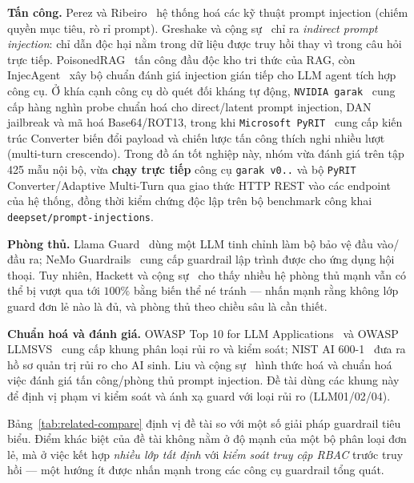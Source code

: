 \textbf{Tấn công.} Perez và Ribeiro~\cite{perez2022ignore} hệ thống hoá các kỹ
thuật prompt injection (chiếm quyền mục tiêu, rò rỉ prompt). Greshake và cộng
sự~\cite{greshake2023indirect} chỉ ra \emph{indirect prompt injection}: chỉ dẫn
độc hại nằm trong dữ liệu được truy hồi thay vì trong câu hỏi trực tiếp.
PoisonedRAG~\cite{zou2024poisonedrag} tấn công đầu độc kho tri thức của RAG, còn
InjecAgent~\cite{zhan2024injecagent} xây bộ chuẩn đánh giá injection gián tiếp cho
LLM agent tích hợp công cụ. Ở khía cạnh công cụ dò quét đối kháng tự động, \texttt{NVIDIA garak}~\cite{derczynski2024garak} cung cấp hàng nghìn probe chuẩn hoá cho direct/latent prompt injection, DAN jailbreak và mã hoá Base64/ROT13, trong khi \texttt{Microsoft PyRIT}~\cite{microsoft_pyrit} cung cấp kiến trúc Converter biến đổi payload và chiến lược tấn công thích nghi nhiều lượt (multi-turn crescendo). Trong đồ án tốt nghiệp này, nhóm vừa đánh giá trên tập 425 mẫu nội bộ, vừa \textbf{chạy trực tiếp} công cụ \texttt{garak v0..} và bộ \texttt{PyRIT} Converter/Adaptive Multi-Turn qua giao thức HTTP REST vào các endpoint của hệ thống, đồng thời kiểm chứng độc lập trên bộ benchmark công khai \texttt{deepset/\allowbreak prompt-\allowbreak injections}.

\textbf{Phòng thủ.} Llama Guard~\cite{inan2023llamaguard} dùng một LLM tinh chỉnh
làm bộ bảo vệ đầu vào/đầu ra; NeMo Guardrails~\cite{rebedea2023nemo} cung cấp
guardrail lập trình được cho ứng dụng hội thoại. Tuy nhiên, Hackett và cộng
sự~\cite{hackett2025bypass} cho thấy nhiều hệ phòng thủ mạnh vẫn có thể bị vượt
qua tới $100\%$ bằng biến thể né tránh --- nhấn mạnh rằng không lớp guard đơn lẻ
nào là đủ, và phòng thủ theo chiều sâu là cần thiết.

\textbf{Chuẩn hoá và đánh giá.} OWASP Top 10 for LLM
Applications~\cite{owasp_llm_top10} và OWASP LLMSVS~\cite{owasp_llmsvs} cung cấp
khung phân loại rủi ro và kiểm soát; NIST AI 600-1~\cite{nist2024genai} đưa ra
hồ sơ quản trị rủi ro cho AI sinh. Liu và cộng sự~\cite{liu2024formalizing} hình
thức hoá và chuẩn hoá việc đánh giá tấn công/phòng thủ prompt injection. Đề tài
dùng các khung này để định vị phạm vi kiểm soát và ánh xạ guard với loại rủi ro
(LLM01/02/04).

Bảng~\ref{tab:related-compare} định vị đề tài so với một số giải pháp guardrail
tiêu biểu. Điểm khác biệt của đề tài không nằm ở độ mạnh của một bộ phân loại đơn
lẻ, mà ở việc kết hợp \emph{nhiều lớp tất định} với \emph{kiểm soát truy cập
RBAC} trước truy hồi --- một hướng ít được nhấn mạnh trong các công cụ guardrail
tổng quát.

